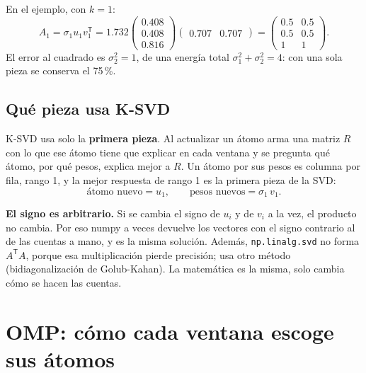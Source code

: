 \documentclass[11pt,letterpaper]{article}
\newcommand{\T}{^{\mathsf{T}}}
\begin{document}
\begin{ejemplo}
    En el ejemplo, con $k = 1$:
    \[
        A_1 = \sigma_1 u_1 v_1\T
            = 1.732
              \begin{pmatrix} 0.408 \\ 0.408 \\ 0.816 \end{pmatrix}
              \begin{pmatrix} 0.707 & 0.707 \end{pmatrix}
            = \begin{pmatrix} 0.5 & 0.5 \\ 0.5 & 0.5 \\ 1 & 1
              \end{pmatrix} .
    \]
    El error al cuadrado es $\sigma_2^2 = 1$, de una energía total
    $\sigma_1^2 + \sigma_2^2 = 4$: con una sola pieza se conserva el
    75\,\%.
\end{ejemplo}

\subsection*{Qué pieza usa K-SVD}

K-SVD usa solo la \textbf{primera pieza}. Al actualizar un átomo arma
una matriz $R$ con lo que ese átomo tiene que explicar en cada ventana
y se pregunta qué átomo, por qué pesos, explica mejor a $R$. Un átomo
por sus pesos es columna por fila, rango 1, y la mejor respuesta de
rango 1 es la primera pieza de la SVD:
\[
    \text{átomo nuevo} = u_1,
    \qquad
    \text{pesos nuevos} = \sigma_1\, v_1 .
\]

\begin{ojo}
    \textbf{El signo es arbitrario.} Si se cambia el signo de $u_i$ y
    de $v_i$ a la vez, el producto no cambia. Por eso numpy a veces
    devuelve los vectores con el signo contrario al de las cuentas a
    mano, y es la misma solución. Además, \texttt{np.linalg.svd} no
    forma $A\T A$, porque esa multiplicación pierde precisión; usa otro
    método (bidiagonalización de Golub-Kahan). La matemática es la
    misma, solo cambia cómo se hacen las cuentas.
\end{ojo}

\newpage


\section{OMP: cómo cada ventana escoge sus átomos}
\end{document}
